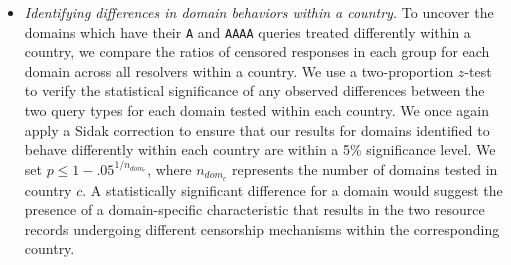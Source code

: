 \begin{itemize}
  \item {\it Identifying differences in domain behaviors within a country.} To
    uncover the domains which have their {\tt A} and {\tt AAAA} queries treated
    differently within a country, we compare the ratios of censored responses
    in each group for each domain across all resolvers within a country. 
    We use a two-proportion $z$-test to verify the statistical significance of
    any observed differences between the two query types for each domain tested
    within each country. We once again apply a Sidak correction to ensure that
    our results for domains identified to behave differently within each country
    are within a 5\% significance level. We set $p \leq
    1-{.05}^{1/n_{dom_{c}}}$, where $n_{dom_{c}}$ represents the number of
    domains tested in country $c$.
    A statistically significant difference for a domain would suggest
    the presence of a domain-specific characteristic that results in the two
    resource records undergoing different censorship mechanisms within the
    corresponding country.
\end{itemize}


